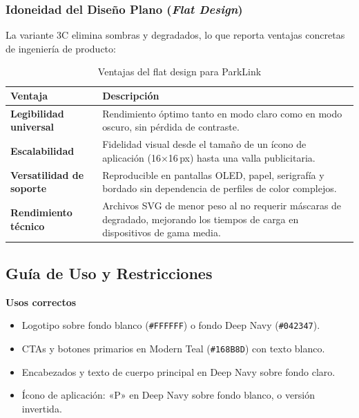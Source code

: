 \subsubsection{Idoneidad del Diseño Plano (\textit{Flat Design})}

La variante 3C elimina sombras y degradados, lo que reporta ventajas concretas de ingeniería de producto: \cite{ixdf_flat_design}

\vspace{0.3cm}

\begin{table}[H]
\centering
\renewcommand{\arraystretch}{1.8}
\begin{tabularx}{\textwidth}{>{\bfseries}p{4cm} X}
\toprule
Ventaja & Descripción \\
\midrule
Legibilidad universal & Rendimiento óptimo tanto en modo claro como en modo oscuro, sin pérdida de contraste. \\
\rowcolor{plgray}
Escalabilidad & Fidelidad visual desde el tamaño de un ícono de aplicación (16×16\,px) hasta una valla publicitaria. \\
Versatilidad de soporte & Reproducible en pantallas OLED, papel, serigrafía y bordado sin dependencia de perfiles de color complejos. \\
\rowcolor{plgray}
Rendimiento técnico & Archivos SVG de menor peso al no requerir máscaras de degradado, mejorando los tiempos de carga en dispositivos de gama media. \\
\bottomrule
\end{tabularx}
\caption{Ventajas del flat design para ParkLink}
\label{tab:flatdesign_colorimetria}
\end{table}

\subsection{Guía de Uso y Restricciones}

\begin{mdframed}[backgroundcolor=plgray, linecolor=midgray, linewidth=0.6pt,
  innertopmargin=10pt, innerbottommargin=10pt,
  innerleftmargin=14pt, innerrightmargin=14pt]
\textbf{Usos correctos}
\begin{itemize}
  \item Logotipo sobre fondo blanco (\texttt{\#FFFFFF}) o fondo Deep Navy (\texttt{\#042347}).
  \item CTAs y botones primarios en Modern Teal (\texttt{\#168B8D}) con texto blanco.
  \item Encabezados y texto de cuerpo principal en Deep Navy sobre fondo claro.
  \item Ícono de aplicación: «P» en Deep Navy sobre fondo blanco, o versión invertida.
\end{itemize}
\end{mdframed}

